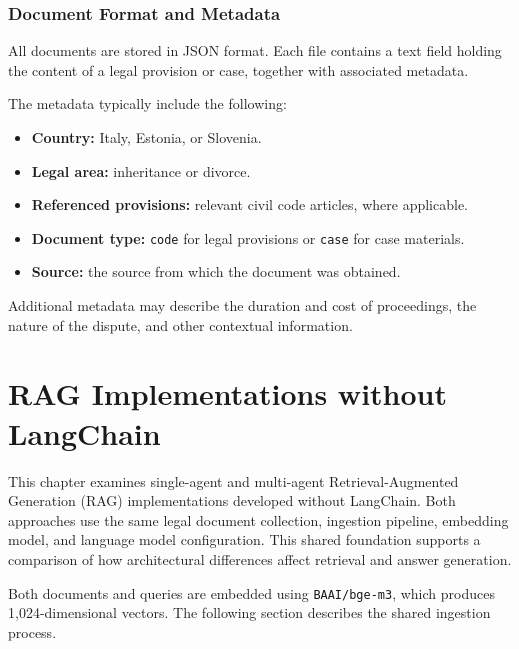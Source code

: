 \documentclass[a4paper,12pt]{report}
\begin{document}
\subsection{Document Format and Metadata}

All documents are stored in JSON format. Each file contains
a text field holding the content of a legal provision or case,
together with associated metadata.

The metadata typically include the following:
\begin{itemize}
    \item \textbf{Country:} Italy, Estonia, or Slovenia.
    \item \textbf{Legal area:} inheritance or divorce.
    \item \textbf{Referenced provisions:} relevant civil code
    articles, where applicable.
    \item \textbf{Document type:} \texttt{code} for legal provisions
    or \texttt{case} for case materials.
    \item \textbf{Source:} the source from which the document
    was obtained.
\end{itemize}

Additional metadata may describe the duration and cost of
proceedings, the nature of the dispute, and other contextual
information.

















\chapter{RAG Implementations without LangChain}
\label{chap:rag-without-langchain}

This chapter examines single-agent and multi-agent
Retrieval-Augmented Generation (RAG) implementations developed
without LangChain. Both approaches use the same legal document
collection, ingestion pipeline, embedding model, and language model
configuration. This shared foundation supports a comparison of how
architectural differences affect retrieval and answer generation.

Both documents and queries are embedded using
\texttt{BAAI/bge-m3}, which produces 1,024-dimensional vectors.
The following section describes the shared ingestion process.
\end{document}
